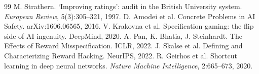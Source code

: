 \documentclass[11pt]{article}
\begin{document}

\begin{thebibliography}{99}
 M. Strathern. `Improving ratings': audit in the British University system. \emph{European Review}, 5(3):305--321, 1997.
 D. Amodei et al. Concrete Problems in AI Safety. arXiv:1606.06565, 2016.
 V. Krakovna et al. Specification gaming: the flip side of AI ingenuity. DeepMind, 2020.
 A. Pan, K. Bhatia, J. Steinhardt. The Effects of Reward Misspecification. ICLR, 2022.
 J. Skalse et al. Defining and Characterizing Reward Hacking. NeurIPS, 2022.
 R. Geirhos et al. Shortcut learning in deep neural networks. \emph{Nature Machine Intelligence}, 2:665--673, 2020.
\end{thebibliography}
\end{document}
